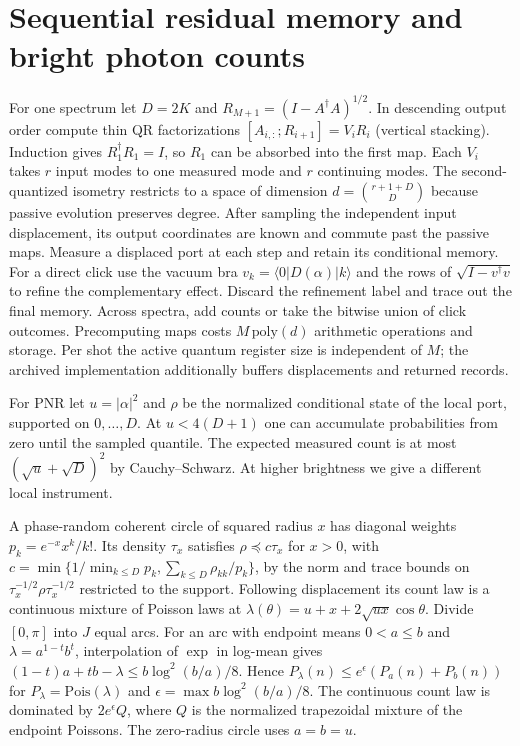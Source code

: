 \documentclass[11pt]{article}
\begin{document}
\section{Sequential residual memory and bright photon counts}\label{sec:memory}
For one spectrum let $D=2K$ and $R_{M+1}=(I-A^\dagger A)^{1/2}$. In descending output order compute thin QR factorizations $[A_{i,:};R_{i+1}]=V_iR_i$ (vertical stacking). Induction gives $R_1^\dagger R_1=I$, so $R_1$ can be absorbed into the first map. Each $V_i$ takes $r$ input modes to one measured mode and $r$ continuing modes. The second-quantized isometry restricts to a space of dimension $d=\binom{r+1+D}{D}$ because passive evolution preserves degree. After sampling the independent input displacement, its output coordinates are known and commute past the passive maps. Measure a displaced port at each step and retain its conditional memory. For a direct click use the vacuum bra $v_k=\langle0|D(\alpha)|k\rangle$ and the rows of $\sqrt{I-v^\dagger v}$ to refine the complementary effect. Discard the refinement label and trace out the final memory. Across spectra, add counts or take the bitwise union of click outcomes. Precomputing maps costs $M\,\mathrm{poly}(d)$ arithmetic operations and storage. Per shot the active quantum register size is independent of $M$; the archived implementation additionally buffers displacements and returned records.

For PNR let $u=|\alpha|^2$ and $\rho$ be the normalized conditional state of the local port, supported on $0,\ldots,D$. At $u<4(D+1)$ one can accumulate probabilities from zero until the sampled quantile. The expected measured count is at most $(\sqrt{u}+\sqrt D)^2$ by Cauchy--Schwarz. At higher brightness we give a different local instrument.

A phase-random coherent circle of squared radius $x$ has diagonal weights $p_k=e^{-x}x^k/k!$. Its density $\tau_x$ satisfies $\rho\preceq c\tau_x$ for $x>0$, with $c=\min\{1/\min_{k\le D}p_k,\sum_{k\le D}\rho_{kk}/p_k\}$, by the norm and trace bounds on $\tau_x^{-1/2}\rho\tau_x^{-1/2}$ restricted to the support. Following displacement its count law is a continuous mixture of Poisson laws at $\lambda(\theta)=u+x+2\sqrt{ux}\cos\theta$. Divide $[0,\pi]$ into $J$ equal arcs. For an arc with endpoint means $0<a\le b$ and $\lambda=a^{1-t}b^t$, interpolation of $\exp$ in log-mean gives $(1-t)a+tb-\lambda\le b\log^2(b/a)/8$. Hence $P_\lambda(n)\le e^\epsilon(P_a(n)+P_b(n))$ for $P_\lambda=\mathrm{Pois}(\lambda)$ and $\epsilon=\max b\log^2(b/a)/8$. The continuous count law is dominated by $2e^\epsilon Q$, where $Q$ is the normalized trapezoidal mixture of the endpoint Poissons. The zero-radius circle uses $a=b=u$.
\end{document}

